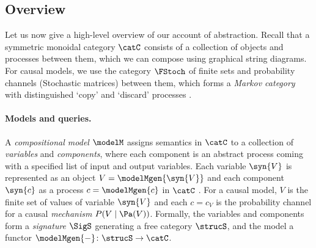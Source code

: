 \documentclass{article}
\begin{document}




\subsection{Overview} \label{subsec:overview}

Let us now give a high-level overview of our account of abstraction. Recall that a symmetric monoidal category $\catC$ consists of a collection of objects and processes between them, which we can compose using graphical string diagrams. For causal models, we use the category $\FStoch$ of finite sets and probability channels (Stochastic matrices) between them, which forms a \emph{Markov category} with distinguished `copy' and `discard' processes \cite{fritz2020synthetic}. 


\paragraph{Models and queries.} A \emph{compositional model} $\modelM$ assigns semantics in $\catC$ to a collection of \emph{variables} and \emph{components}, where each component is an abstract process coming with a specified list of input and output variables. Each variable $\syn{V}$ is represented as an object $V=\modelMgen{\syn{V}}$ and each component $\syn{c}$ as a process $c = \modelMgen{c}$ in $\catC$ . For a causal model, $V$ is the finite set of values of variable $\syn{V}$ and each $c=c_V$ is the probability channel for a causal \emph{mechanism} $P(V \mid \Pa(V))$. 
Formally, the variables and components form a \emph{signature} $\SigS$ generating a free category $\strucS$, and the model a functor $\modelMgen{-} \colon \strucS \to \catC$.
\end{document}
